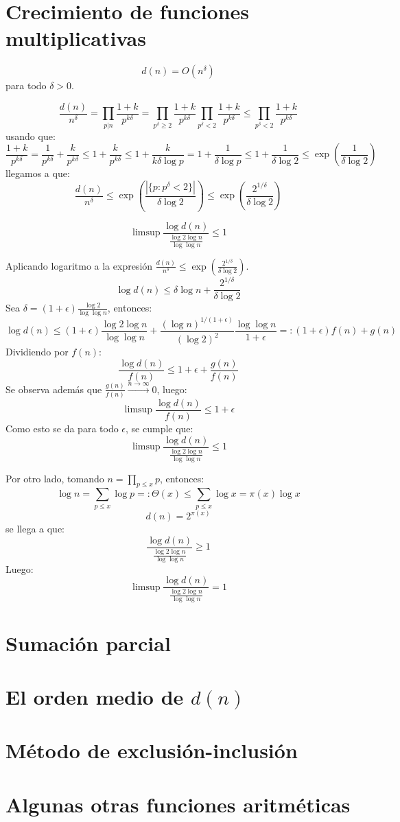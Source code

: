 \documentclass[TAN.tex]{subfiles}
\begin{document}
\section{Crecimiento de funciones multiplicativas}
\begin{prop}
\[ d(n) = O(n^δ) \]
para todo $δ > 0$.
\end{prop}
\begin{dem}
\[ \frac{d(n)}{n^δ} = \prod_{p|n} \frac{1+k}{p^{kδ}} = \prod_{p^δ≥2}\frac{1+k}{p^{kδ}} \prod_{p^δ<2}\frac{1+k}{p^{kδ}} ≤ \prod_{p^δ<2} \frac{1+k}{p^{kδ}}\]
usando que:
\[ \frac{1+k}{p^{kδ}} = \frac{1}{p^{kδ}}+\frac{k}{p^{kδ}} ≤ 1 + \frac{k}{p^{kδ}} ≤ 1 + \frac{k}{kδ\log p} = 1 + \frac{1}{δ\log p} ≤ 1 + \frac{1}{δ\log 2} ≤ \exp\left(\frac{1}{δ\log 2}\right)\]
llegamos a que:
\[ \frac{d(n)}{n^δ} ≤ \exp\left(\frac{|\{p : p^δ<2\}|}{δ\log2}\right) ≤ \exp\left(\frac{2^{1/δ}}{δ\log 2}\right)\]
\end{dem}

\begin{prop}
\[ \limsup \frac{\log d(n)}{\frac{\log 2 \log n}{\log \log n}} ≤ 1\]
\end{prop}
\begin{dem}
Aplicando logaritmo a la expresión $\frac{d(n)}{n^δ} ≤ \exp\left(\frac{2^{1/δ}}{δ\log 2}\right)$.
\[
	\log d(n) ≤ δ\log n + \frac{2^{1/δ}}{δ\log 2}
\]
Sea $δ = (1+ϵ)\frac{\log 2}{\log \log n}$, entonces:
\[
	\log d(n) ≤ (1+ϵ) \frac{\log 2 \log n}{\log \log n} + \frac{(\log n)^{1/(1+ϵ)}}{(\log 2)^2} \frac{\log \log n}{1+ϵ} =: (1+ϵ)f(n) + g(n)
\]
Dividiendo por $f(n)$:
\[ 
	\frac{\log d(n)}{f(n)} ≤ 1 + ϵ + \frac{g(n)}{f(n)}
\]
Se observa además que $\frac{g(n)}{f(n)} \xrightarrow{n \to ∞} 0$, luego:
\[ 
	\limsup \frac{\log d(n)}{f(n)} ≤ 1+ϵ
\]
Como esto se da para todo $ϵ$, se cumple que:
\[ 
	\limsup \frac{\log d(n)}{\frac{\log 2 \log n}{\log \log n}} ≤ 1
\]

Por otro lado, tomando $n = \prod_{p≤x} p$, entonces:
\[ \log n = \sum_{p≤x} \log p =: Θ(x) ≤ \sum_{p≤x} \log x = π(x) \log x \]
\[ d(n) = 2^{π(x)} \]
se llega a que:
\[ \frac{\log d(n)}{\frac{\log 2 \log n}{\log \log n}} ≥ 1 \]
Luego:
\[
	\limsup \frac{\log d(n)}{\frac{\log 2 \log n}{\log \log n}} = 1 
\]
\end{dem}
\section{Sumación parcial}

\section{El orden medio de $d(n)$}

\section{Método de exclusión-inclusión}

\section{Algunas otras funciones aritméticas}
\end{document}
